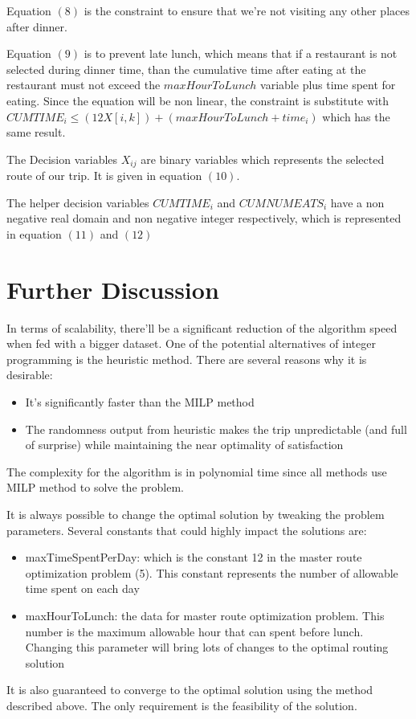 \documentclass{article}
\begin{document}
\begin{itemize}
		Equation $(8)$ is the constraint to ensure that we're not visiting any other places after dinner.
		
		Equation $(9)$ is to prevent late lunch, which means that if a restaurant is not selected during dinner time, than the cumulative time after eating at the restaurant must not exceed the $maxHourToLunch$ variable plus time spent for eating. Since the equation will be non linear, the constraint is substitute with $CUMTIME_{i} \le (12X[i, k]) + (maxHourToLunch + time_{i})$ which has the same result.
		
		The Decision variables $X_{ij}$ are binary variables which represents the selected route of our trip. It is given in equation $(10)$.
		
		The helper decision variables $CUMTIME_{i}$ and $CUMNUMEATS_{i}$ have a non negative real domain and non negative integer respectively, which is represented in equation $(11)$ and $(12)$
		
	\end{itemize}

	\section*{Further Discussion}

	In terms of scalability, there'll be a significant reduction of the algorithm speed when fed with a bigger dataset. One of the potential alternatives of integer programming is the heuristic method. There are several reasons why it is desirable: 
	
	\begin{itemize}
		\item It's significantly faster than the MILP method
		\item The randomness output from heuristic makes the trip unpredictable (and full of surprise) while maintaining the near optimality of satisfaction
	\end{itemize}

	The complexity for the algorithm is in polynomial time since all methods use MILP method to solve the problem. 
	
	It is always possible to change the optimal solution by tweaking the problem parameters. Several constants that could highly impact the solutions are:
	
	\begin{itemize}
		\item maxTimeSpentPerDay: which is the constant 12 in the master route optimization problem (5). This constant represents the number of allowable time spent on each day
		\item maxHourToLunch: the data for master route optimization problem. This number is the maximum allowable hour that can spent before lunch. Changing this parameter will bring lots of changes to the optimal routing solution
	\end{itemize}
	
	
	
	It is also guaranteed to converge to the optimal solution using the method described above. The only requirement is the feasibility of the solution. 
\end{document}
